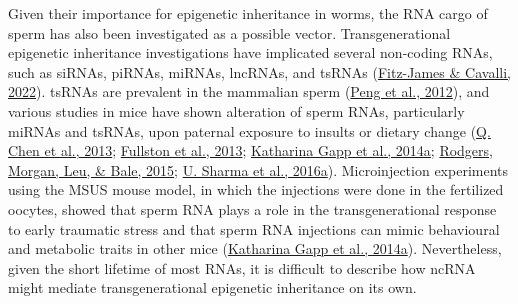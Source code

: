 \documentclass[12pt,twoside]{reedthesis}
\begin{document}
Given their importance for epigenetic inheritance in worms, the RNA
cargo of sperm has also been investigated as a possible vector.
Transgenerational epigenetic inheritance investigations have implicated
several non-coding RNAs, such as siRNAs, piRNAs, miRNAs, lncRNAs, and
tsRNAs (\protect\hyperlink{ref-fitz-james2022}{Fitz-James \& Cavalli, 2022}). tsRNAs are prevalent in the mammalian sperm
(\protect\hyperlink{ref-peng2012}{Peng et al., 2012}), and various studies in mice have shown alteration of sperm
RNAs, particularly miRNAs and tsRNAs, upon paternal exposure to insults
or dietary change (\protect\hyperlink{ref-chen2013}{Q. Chen et al., 2013}; \protect\hyperlink{ref-fullston2013}{Fullston et al., 2013}; \protect\hyperlink{ref-gapp2014}{Katharina Gapp et al., 2014a}; \protect\hyperlink{ref-rodgers2015}{Rodgers, Morgan, Leu, \& Bale, 2015}; \protect\hyperlink{ref-sharma2016}{U. Sharma et al., 2016a}). Microinjection experiments using the MSUS mouse model, in
which the injections were done in the fertilized oocytes, showed that
sperm RNA plays a role in the transgenerational response to early
traumatic stress and that sperm RNA injections can mimic behavioural and
metabolic traits in other mice (\protect\hyperlink{ref-gapp2014}{Katharina Gapp et al., 2014a}). Nevertheless, given the
short lifetime of most RNAs, it is difficult to describe how ncRNA might
mediate transgenerational epigenetic inheritance on its own.
\end{document}
